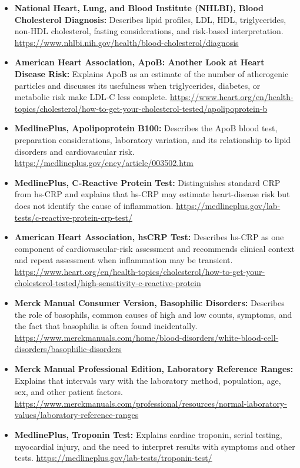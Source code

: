 \documentclass[11pt,openany]{book}
\begin{document}
\begin{itemize}[leftmargin=*]
  \item \textbf{National Heart, Lung, and Blood Institute (NHLBI), Blood Cholesterol Diagnosis:} Describes lipid profiles, LDL, HDL, triglycerides, non-HDL cholesterol, fasting considerations, and risk-based interpretation. \url{https://www.nhlbi.nih.gov/health/blood-cholesterol/diagnosis}
  \item \textbf{American Heart Association, ApoB: Another Look at Heart Disease Risk:} Explains ApoB as an estimate of the number of atherogenic particles and discusses its usefulness when triglycerides, diabetes, or metabolic risk make LDL-C less complete. \url{https://www.heart.org/en/health-topics/cholesterol/how-to-get-your-cholesterol-tested/apolipoprotein-b}
  \item \textbf{MedlinePlus, Apolipoprotein B100:} Describes the ApoB blood test, preparation considerations, laboratory variation, and its relationship to lipid disorders and cardiovascular risk. \url{https://medlineplus.gov/ency/article/003502.htm}
  \item \textbf{MedlinePlus, C-Reactive Protein Test:} Distinguishes standard CRP from hs-CRP and explains that hs-CRP may estimate heart-disease risk but does not identify the cause of inflammation. \url{https://medlineplus.gov/lab-tests/c-reactive-protein-crp-test/}
  \item \textbf{American Heart Association, hsCRP Test:} Describes hs-CRP as one component of cardiovascular-risk assessment and recommends clinical context and repeat assessment when inflammation may be transient. \url{https://www.heart.org/en/health-topics/cholesterol/how-to-get-your-cholesterol-tested/high-sensitivity-c-reactive-protein}
  \item \textbf{Merck Manual Consumer Version, Basophilic Disorders:} Describes the role of basophils, common causes of high and low counts, symptoms, and the fact that basophilia is often found incidentally. \url{https://www.merckmanuals.com/home/blood-disorders/white-blood-cell-disorders/basophilic-disorders}
  \item \textbf{Merck Manual Professional Edition, Laboratory Reference Ranges:} Explains that intervals vary with the laboratory method, population, age, sex, and other patient factors. \url{https://www.merckmanuals.com/professional/resources/normal-laboratory-values/laboratory-reference-ranges}
  \item \textbf{MedlinePlus, Troponin Test:} Explains cardiac troponin, serial testing, myocardial injury, and the need to interpret results with symptoms and other tests. \url{https://medlineplus.gov/lab-tests/troponin-test/}

\end{itemize}
\end{document}
